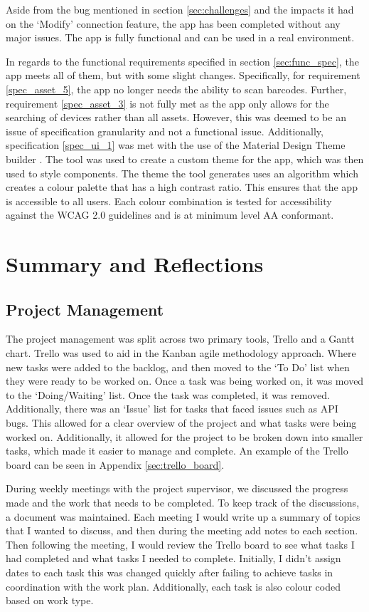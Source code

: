 \documentclass [11pt,a4paper]{article}
\begin{document}
Aside from the bug mentioned in section \ref{sec:challenges} and the impacts it had on the `Modify' connection feature, the app has been completed without any major issues. The app is fully functional and can be used in a real environment. 

In regards to the functional requirements specified in section \ref{sec:func_spec}, the app meets all of them, but with some slight changes. Specifically, for requirement \ref{spec_asset_5}, the app no longer needs the ability to scan barcodes. Further, requirement \ref{spec_asset_3} is not fully met as the app only allows for the searching of devices rather than all assets. However, this was deemed to be an issue of specification granularity and not a functional issue. Additionally, specification \ref{spec_ui_1} was met with the use of the Material Design Theme builder \cite{material3ColourTool}. The tool was used to create a custom theme for the app, which was then used to style components. The theme the tool generates uses an algorithm which creates a colour palette that has a high contrast ratio. This ensures that the app is accessible to all users. Each colour combination is tested for accessibility against the WCAG 2.0 guidelines \cite{caldwell2008web} and is at minimum level AA conformant.
\pagebreak
\section{Summary and Reflections}
\label{sec:summary}
\subsection{Project Management}
\label{sec:project_management_summary}

The project management was split across two primary tools, Trello and a Gantt chart. Trello was used to aid in the Kanban agile methodology approach. Where new tasks were added to the backlog, and then moved to the `To Do' list when they were ready to be worked on. Once a task was being worked on, it was moved to the `Doing/Waiting' list. Once the task was completed, it was removed. Additionally, there was an `Issue' list for tasks that faced issues such as API bugs. This allowed for a clear overview of the project and what tasks were being worked on. Additionally, it allowed for the project to be broken down into smaller tasks, which made it easier to manage and complete. An example of the Trello board can be seen in Appendix \ref{sec:trello_board}.

During weekly meetings with the project supervisor, we discussed the progress made and the work that needs to be completed. To keep track of the discussions, a document was maintained. Each meeting I would write up a summary of topics that I wanted to discuss, and then during the meeting add notes to each section. Then following the meeting, I would review the Trello board to see what tasks I had completed and what tasks I needed to complete. Initially, I didn't assign dates to each task this was changed quickly after failing to achieve tasks in coordination with the work plan. Additionally, each task is also colour coded based on work type.
\end{document}
